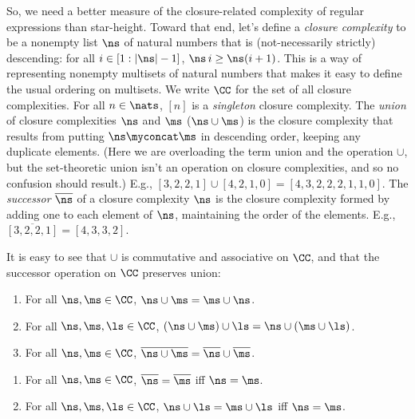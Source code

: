 So, we need a better measure of the closure-related complexity of
regular expressions than star-height.  Toward that end, let's define a
\emph{closure complexity} to be a nonempty list $\ns$ of natural
numbers that is (not-necessarily strictly) descending: for all
$i\in[1:|\ns|-1]$, $\ns\,i\geq \ns(i+1)$.  This is a way of
representing nonempty multisets of natural numbers that makes it easy
to define the usual ordering on multisets. We write $\CC$ for the set
of all closure complexities.  For all $n\in\nats$, $[n]$ is a
\emph{singleton} closure complexity.  The \emph{union} of closure
complexities $\ns$ and $\ms$ ($\ns\cup\ms$) is the closure complexity
that results from putting $\ns\myconcat\ms$ in descending order,
keeping any duplicate elements.  (Here we are overloading the term
union and the operation $\cup$, but the set-theoretic union isn't an
operation on closure complexities, and so no confusion should result.)
E.g., $[3,2,2,1]\cup[4,2,1,0] = [4,3,2,2,2,1,1,0]$.  The
\emph{successor} $\overline{\ns}$ of a closure complexity $\ns$ is the
closure complexity formed by adding one to each element of $\ns$,
maintaining the order of the elements.  E.g., $\overline{[3,2,2,1]} =
[4,3,3,2]$.

It is easy to see that $\cup$ is commutative and associative on $\CC$,
and that the successor operation on $\CC$ preserves union:

\begin{proposition}
\begin{enumerate}[\quad(1)]
\item For all $\ns,\ms\in\CC$, $\ns\cup\ms = \ms\cup\ns$.

\item For all $\ns,\ms,\ls\in\CC$, $(\ns\cup\ms)\cup\ls = \ns\cup(\ms\cup\ls)$.

\item For all $\ns,\ms\in\CC$, $\overline{\ns\cup\ms} =
  \overline{\ns}\cup\overline{\ms}$.
\end{enumerate}
\end{proposition}

\begin{proposition}
\begin{enumerate}[\quad(1)]
\label{CCEquivContext}
\item For all $\ns,\ms\in\CC$, $\overline{\ns} = \overline{\ms}$ iff
  $\ns=\ms$.

\item For all $\ns,\ms,\ls\in\CC$, $\ns\cup\ls = \ms\cup\ls$ iff
  $\ns = \ms$.
\end{enumerate}
\end{proposition}

